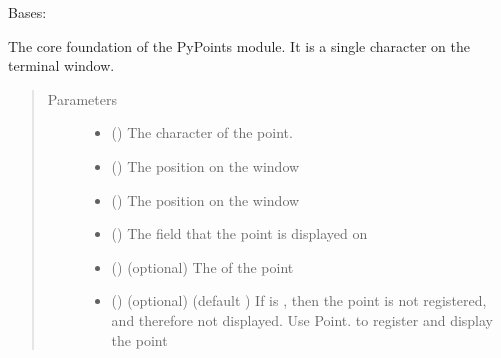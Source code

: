 \documentclass[letterpaper,10pt,english]{sphinxmanual}
\begin{document}
\begin{fulllineitems}
\label{\detokenize{pypoints:pypoints.Point}}
Bases: 

The core foundation of the PyPoints module. It is a single character on the terminal window.
\begin{quote}\begin{description}
\item[{Parameters}] \leavevmode\begin{itemize}
\item {} 
 () \textendash{} The character of the point.

\item {} 
 () \textendash{} The  position on the window

\item {} 
 () \textendash{} The  position on the window

\item {} 
 () \textendash{} The field that the point is displayed on

\item {} 
 ({\hyperref[\detokenize{pypoints:pypoints.Font}]{}}) \textendash{} (optional) The {\hyperref[\detokenize{pypoints:pypoints.Font}]{}} of the point

\item {} 
 () \textendash{} (optional) (default ) If  is , then the point is not registered, and therefore not displayed. Use Point.{\hyperref[\detokenize{pypoints:pypoints.Point.activate}]{}} to register and display the point


\end{itemize}
\end{description}
\end{quote}
\end{fulllineitems}
\end{document}

